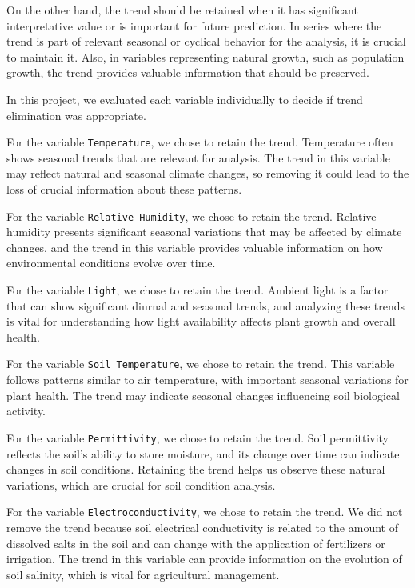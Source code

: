 On the other hand, the trend should be retained when it has significant interpretative value or is important for future prediction. In series where the trend is part of relevant seasonal or cyclical behavior for the analysis, it is crucial to maintain it. Also, in variables representing natural growth, such as population growth, the trend provides valuable information that should be preserved.

In this project, we evaluated each variable individually to decide if trend elimination was appropriate.

For the variable \texttt{Temperature}, we chose to retain the trend. Temperature often shows seasonal trends that are relevant for analysis. The trend in this variable may reflect natural and seasonal climate changes, so removing it could lead to the loss of crucial information about these patterns.

For the variable \texttt{Relative Humidity}, we chose to retain the trend. Relative humidity presents significant seasonal variations that may be affected by climate changes, and the trend in this variable provides valuable information on how environmental conditions evolve over time.

For the variable \texttt{Light}, we chose to retain the trend. Ambient light is a factor that can show significant diurnal and seasonal trends, and analyzing these trends is vital for understanding how light availability affects plant growth and overall health.

For the variable \texttt{Soil Temperature}, we chose to retain the trend. This variable follows patterns similar to air temperature, with important seasonal variations for plant health. The trend may indicate seasonal changes influencing soil biological activity.

For the variable \texttt{Permittivity}, we chose to retain the trend. Soil permittivity reflects the soil's ability to store moisture, and its change over time can indicate changes in soil conditions. Retaining the trend helps us observe these natural variations, which are crucial for soil condition analysis.

For the variable \texttt{Electroconductivity}, we chose to retain the trend. We did not remove the trend because soil electrical conductivity is related to the amount of dissolved salts in the soil and can change with the application of fertilizers or irrigation. The trend in this variable can provide information on the evolution of soil salinity, which is vital for agricultural management.

